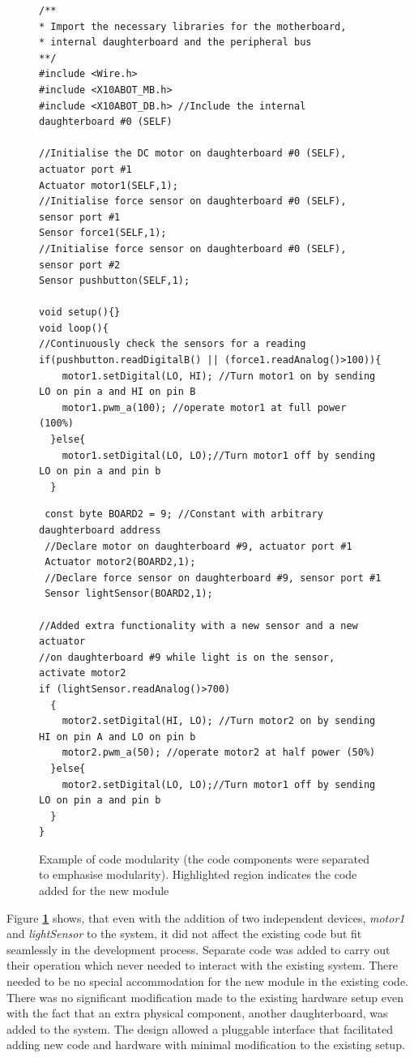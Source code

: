 \begin{figure}
		\footnotesize
        {\fontsize{8}{6}\selectfont
		
		\begin{verbatim}
        \end{verbatim}
        \begin{verbatim}
/**
* Import the necessary libraries for the motherboard, 
* internal daughterboard and the peripheral bus
**/
#include <Wire.h>  
#include <X10ABOT_MB.h>
#include <X10ABOT_DB.h> //Include the internal daughterboard #0 (SELF)

//Initialise the DC motor on daughterboard #0 (SELF), actuator port #1
Actuator motor1(SELF,1);
//Initialise force sensor on daughterboard #0 (SELF), sensor port #1
Sensor force1(SELF,1);
//Initialise force sensor on daughterboard #0 (SELF), sensor port #2
Sensor pushbutton(SELF,1);
   
void setup(){}
void loop(){
//Continuously check the sensors for a reading
if(pushbutton.readDigitalB() || (force1.readAnalog()>100)){
    motor1.setDigital(LO, HI); //Turn motor1 on by sending LO on pin a and HI on pin B
    motor1.pwm_a(100); //operate motor1 at full power (100%) 
  }else{
    motor1.setDigital(LO, LO);//Turn motor1 off by sending LO on pin a and pin b
  }
 \end{verbatim}
 \begin{verbatim}
 const byte BOARD2 = 9; //Constant with arbitrary daughterboard address
 //Declare motor on daughterboard #9, actuator port #1
 Actuator motor2(BOARD2,1);
 //Declare force sensor on daughterboard #9, sensor port #1
 Sensor lightSensor(BOARD2,1);
 
//Added extra functionality with a new sensor and a new actuator
//on daughterboard #9 while light is on the sensor, activate motor2
if (lightSensor.readAnalog()>700)
  {
    motor2.setDigital(HI, LO); //Turn motor2 on by sending HI on pin A and LO on pin b
    motor2.pwm_a(50); //operate motor2 at half power (50%)
  }else{
    motor2.setDigital(LO, LO);//Turn motor1 off by sending LO on pin a and pin b
  }
}	 
	\end{verbatim}
		}
    \caption{Example of code modularity (the code components were separated to emphasise modularity). Highlighted region indicates the code added for the new module} \label{code:modularity}
\end{figure}
Figure \textbf{\ref{code:modularity}} shows, that even with the addition of two independent devices, \emph{motor1} and \emph{lightSensor} to the system, it did not affect the existing code but fit seamlessly in the development process. Separate code was added to carry out their operation which never needed to interact with the existing system. There needed to be no special accommodation for the new module in the existing code. There was no significant modification made to the existing hardware setup even with the fact that an extra physical component, another daughterboard, was added to the system. The \xten design allowed a pluggable interface that facilitated adding new code and hardware with minimal modification to the existing setup.
